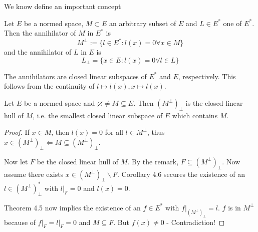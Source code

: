 We know define an important concept
\begin{definition}
Let $E$ be a normed space, $M \subset E$ an arbitrary subset of $E$ and $L \in E^{\ast}$ one of $E^{\ast}$. Then the annihilator of $M$ in $E^{\ast}$ is
\begin{equation*}
M^{\perp} := \{ l \in E^{\ast} : l(x) =0 \forall x \in M \}
\end{equation*}
and the annihilator of $L$ in $E$ is
\begin{equation*}
L_{\perp} = \{ x \in E: l(x)=0 \forall l\in L \}
\end{equation*}
\end{definition}

\begin{rem} 
The annihilators are closed linear subspaces of $E^{\ast}$ and $E$, respectively. This follows from the continuity of $l \mapsto l(x), x \mapsto l(x)$.
\end{rem}

\begin{lemma} Let $E$ be a normed space and $\varnothing \neq M \subseteq E$. Then $(M^{\perp})_{\perp}$ is the closed linear hull of $M$, i.e. the smallest closed linear subspace of $E$ which contains $M$.
\end{lemma}
\begin{proof}
If $x \in M$, then $l(x)=0$ for all $l \in M^{\perp}$, thus $x \in (M^{\perp})_{\perp} \Leftarrow M \subseteq (M^{\perp})_{\perp}$.

Now let $F$ be the closed linear hull of $M$. By the remark, $F \subseteq (M^{\perp})_{\perp}$. Now assume there exists $x \in (M^{\perp})_{\perp} \backslash F$. Corollary 4.6 secures the existence of an $l \in (M^{\perp})_{\perp}^{\ast}$ with $l \vert_F=0$ and $l(x)=0$.

Theorem 4.5 now implies the existence of an $f \in E^{\ast}$ with $f\vert_{(M^{\perp})_{\perp}}=l$. $f$ is in $M^{\perp}$ because of $f\vert_F = l\vert_F =0$ and $M\subseteq F$. But $f(x)\neq 0$ - Contradiction! 
\end{proof}

